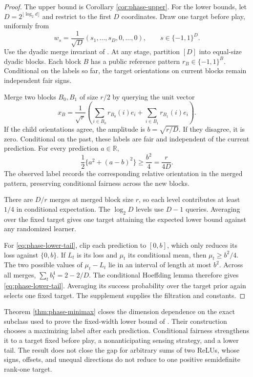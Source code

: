 \documentclass[twoside]{article}
\newcommand{\R}{\mathbb R}
\begin{document}
\begin{proof}
The upper bound is Corollary \ref{cor:phase-upper}. For the lower bounds, let $D=2^{\lfloor\log_2d\rfloor}$ and restrict to the first $D$ coordinates. Draw one target before play, uniformly from
\begin{equation}
w_s=\frac1{\sqrt D}(s_1,\ldots,s_D,0,\ldots,0),\qquad s\in\{-1,1\}^D.
\end{equation}
Use the dyadic merge invariant of \citet{doronarad2026online}. At any stage, partition $[D]$ into equal-size dyadic blocks. Each block $B$ has a public reference pattern $r_B\in\{-1,1\}^B$. Conditional on the labels so far, the target orientations on current blocks remain independent fair signs.

Merge two blocks $B_0,B_1$ of size $r/2$ by querying the unit vector
\begin{equation}
x_B=\frac1{\sqrt r}\left(\sum_{i\in B_0}r_{B_0}(i)e_i+
\sum_{i\in B_1}r_{B_1}(i)e_i\right).
\label{eq:merge-query}
\end{equation}
If the child orientations agree, the amplitude is $b=\sqrt{r/D}$. If they disagree, it is zero. Conditional on the past, these labels are fair and independent of the current prediction. For every prediction $a\in\R$,
\begin{equation}
\frac12\{a^2+(a-b)^2\}\geq\frac{b^2}{4}=\frac{r}{4D}.
\label{eq:merge-loss}
\end{equation}
The observed label records the corresponding relative orientation in the merged pattern, preserving conditional fairness across the new blocks.

There are $D/r$ merges at merged block size $r$, so each level contributes at least $1/4$ in conditional expectation. The $\log_2D$ levels use $D-1$ queries. Averaging over the fixed target gives one target attaining the expected lower bound against any randomized learner.

For \eqref{eq:phase-lower-tail}, clip each prediction to $[0,b]$, which only reduces its loss against $\{0,b\}$. If $L_t$ is its loss and $\mu_t$ its conditional mean, then $\mu_t\geq b^2/4$. The two possible values of $\mu_t-L_t$ lie in an interval of length at most $b^2$. Across all merges, $\sum_tb_t^4=2-2/D$. The conditional Hoeffding lemma therefore gives \eqref{eq:phase-lower-tail}. Averaging its success probability over the target prior again selects one fixed target. The supplement supplies the filtration and constants.
\end{proof}

Theorem \ref{thm:phase-minimax} closes the dimension dependence on the exact subclass used to prove the fixed-width lower bound of \citet{doronarad2026online}. Their construction chooses a maximizing label after each prediction. Conditional fairness strengthens it to a target fixed before play, a nonanticipating sensing strategy, and a lower tail. The result does not close the gap for arbitrary sums of two ReLUs, whose signs, offsets, and unequal directions do not reduce to one positive semidefinite rank-one target.
\end{document}
